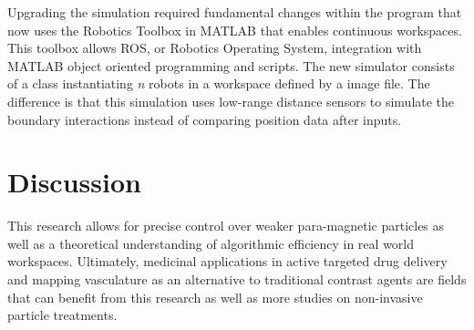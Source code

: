 \documentclass[letterpaper, 9 pt, conference]{ieeeconf}  %
\begin{document}
	Upgrading the simulation required fundamental changes within the program that now uses the Robotics Toolbox in MATLAB that enables continuous workspaces. This toolbox allows ROS, or Robotics Operating System, integration with MATLAB object oriented programming and scripts. The new simulator consists of a class instantiating \textit{n} robots in a workspace defined by a image file. The difference is that this simulation uses low-range distance sensors to simulate the boundary interactions instead of comparing position data after inputs. 
\section{Discussion}\label{sec:Discussion}
	This research allows for precise control over weaker para-magnetic particles as well as a theoretical understanding of algorithmic efficiency in real world workspaces. Ultimately, medicinal applications in active targeted drug delivery and mapping vasculature as an alternative to traditional contrast agents are fields that can benefit from this research as well as more studies on non-invasive particle treatments. 
\end{document}
